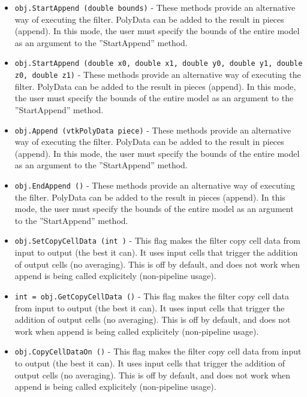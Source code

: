\begin{itemize}
\item  \verb|obj.StartAppend (double bounds)| -  These methods provide an alternative way of executing the filter.
 PolyData can be added to the result in pieces (append).
 In this mode, the user must specify the bounds of the entire model
 as an argument to the ''StartAppend'' method.

\item  \verb|obj.StartAppend (double x0, double x1, double y0, double y1, double z0, double z1)| -  These methods provide an alternative way of executing the filter.
 PolyData can be added to the result in pieces (append).
 In this mode, the user must specify the bounds of the entire model
 as an argument to the ''StartAppend'' method.

\item  \verb|obj.Append (vtkPolyData piece)| -  These methods provide an alternative way of executing the filter.
 PolyData can be added to the result in pieces (append).
 In this mode, the user must specify the bounds of the entire model
 as an argument to the ''StartAppend'' method.

\item  \verb|obj.EndAppend ()| -  These methods provide an alternative way of executing the filter.
 PolyData can be added to the result in pieces (append).
 In this mode, the user must specify the bounds of the entire model
 as an argument to the ''StartAppend'' method.

\item  \verb|obj.SetCopyCellData (int )| -  This flag makes the filter copy cell data from input to output 
 (the best it can).  It uses input cells that trigger the addition
 of output cells (no averaging).  This is off by default, and does
 not work when append is being called explicitely (non-pipeline usage).

\item  \verb|int = obj.GetCopyCellData ()| -  This flag makes the filter copy cell data from input to output 
 (the best it can).  It uses input cells that trigger the addition
 of output cells (no averaging).  This is off by default, and does
 not work when append is being called explicitely (non-pipeline usage).

\item  \verb|obj.CopyCellDataOn ()| -  This flag makes the filter copy cell data from input to output 
 (the best it can).  It uses input cells that trigger the addition
 of output cells (no averaging).  This is off by default, and does
 not work when append is being called explicitely (non-pipeline usage).


\end{itemize}
